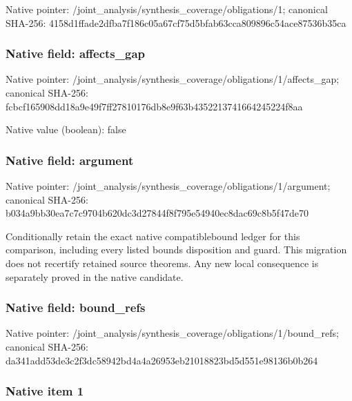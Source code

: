 \documentclass[10pt,a4paper]{article}
\begin{document}
Native pointer: /joint\_analysis/synthesi\allowbreak{}s\_coverage/obligations/1; canonical SHA-256: 4158d1ffade2dfba7f186c05\allowbreak{}a67cf75d5bfab63cca809896\allowbreak{}c54ace87536b35ca



\subsubsection{Native field: affects\_gap}


Native pointer: /joint\_analysis/synthesi\allowbreak{}s\_coverage/obligations/1\allowbreak{}/affects\_gap; canonical SHA-256: fcbcf165908dd18a9e49f7ff\allowbreak{}27810176db8e9f63b4352213\allowbreak{}741664245224f8aa



Native value (boolean): false



\subsubsection{Native field: argument}


Native pointer: /joint\_analysis/synthesi\allowbreak{}s\_coverage/obligations/1\allowbreak{}/argument; canonical SHA-256: b034a9bb30ea7c7c9704b620\allowbreak{}dc3d27844f8f795e54940ec8\allowbreak{}dac69c8b5f47de70


Conditionally retain the exact native compatiblebound ledger for this comparison, including every listed bounds disposition and guard. This migration does not recertify retained source theorems. Any new local consequence is separately proved in the native candidate.


\subsubsection{Native field: bound\_refs}


Native pointer: /joint\_analysis/synthesi\allowbreak{}s\_coverage/obligations/1\allowbreak{}/bound\_refs; canonical SHA-256: da341add53de3c2f3dc58942\allowbreak{}bd4a4a26953eb21018823bd5\allowbreak{}d551e98136b0b264



\subsubsection{Native item 1}
\end{document}
